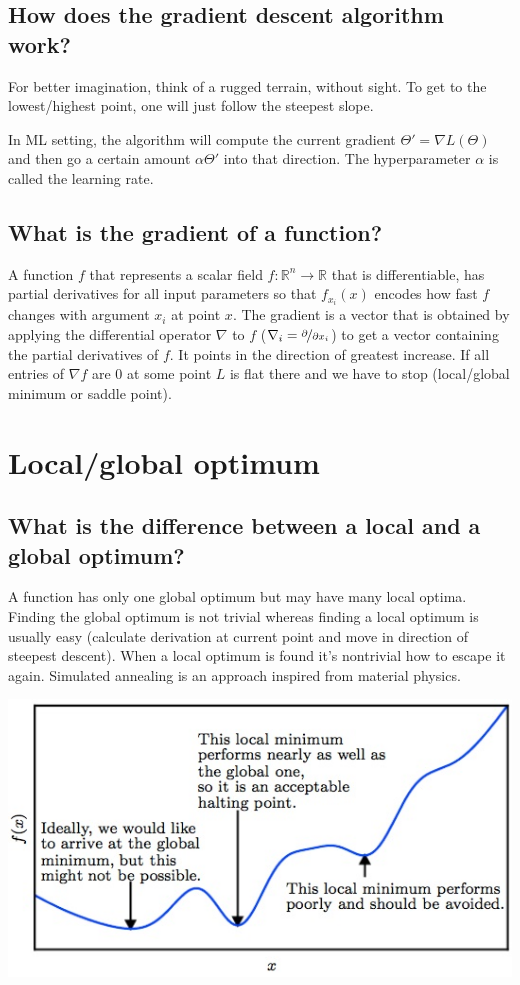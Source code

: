 \subsection{How does the gradient descent algorithm work?}
For better imagination, think of a rugged terrain, without sight. To get to the lowest/highest point, one will just follow the steepest slope. 

In  ML setting, the algorithm will compute the current gradient $\Theta' = \nabla L(\Theta)$ and then go a certain amount $\alpha\Theta'$ into that direction. The hyperparameter $\alpha$ is called the learning rate.
\subsection{What is the gradient of a function? }
A function $f$ that represents a scalar field $f: \mathbb R^n \to \mathbb R$ that is differentiable, has partial derivatives for all input parameters so that $f_{x_i}(x)$ encodes how fast $f$ changes with argument $x_i$ at point $x$.  The gradient is a vector that is obtained by applying the differential operator $\nabla$ to $f$ ($\nabla_i = \nicefrac{\partial}{\partial x_i}$) to get a vector containing the partial derivatives of $f$. It points in the direction of greatest increase. If all entries of $\nabla f$ are $0$ at some point $L$ is flat there and we have to stop (local/global minimum or saddle point).

\section{Local/global optimum}
\subsection{What is the difference between a local and a global optimum?}
\begin{minipage}{0.5\textwidth}
A function has only one global optimum but may have many local optima. Finding the global optimum is not trivial whereas finding a local optimum is usually easy (calculate derivation at current point and move in direction of steepest descent). When a local optimum is found it's nontrivial how to escape it again. Simulated annealing is an approach inspired from material physics.
\end{minipage}
\begin{minipage}{0.5\textwidth}
\includegraphics[width=\textwidth]{./img/localOpt.jpeg}
\end{minipage}

